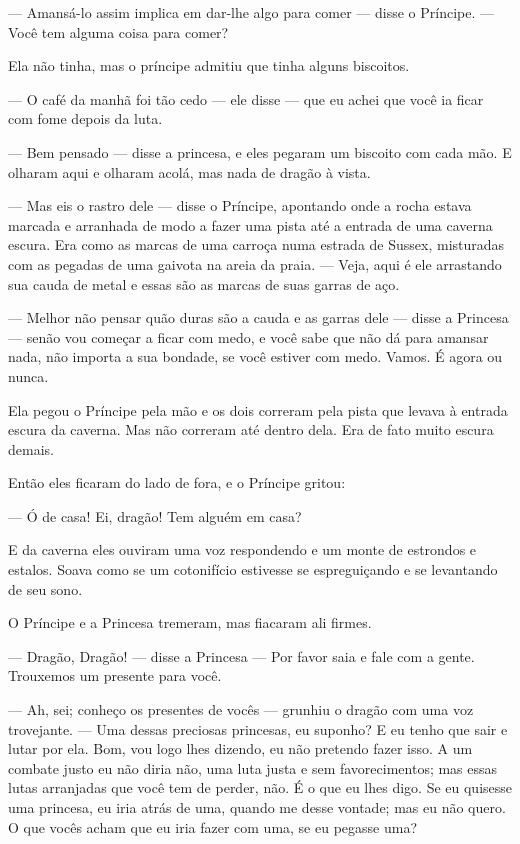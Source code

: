 — Amansá-lo assim implica em dar-lhe algo para comer — disse o
Príncipe. — Você tem alguma coisa para comer?

Ela não tinha, mas o príncipe admitiu que tinha alguns biscoitos. 

— O café da manhã foi tão cedo — ele disse — que eu achei que você ia
ficar com fome depois da luta.

— Bem pensado — disse a princesa, e eles pegaram um biscoito com cada
mão. E olharam aqui e olharam acolá, mas nada de dragão à vista.

— Mas eis o rastro dele — disse o Príncipe, apontando onde a rocha
estava marcada e arranhada de modo a fazer uma pista até a entrada de
uma caverna escura. Era como as marcas de uma carroça numa estrada de
Sussex, misturadas com as pegadas de uma gaivota na areia da praia. —
Veja, aqui é ele arrastando sua cauda de metal e essas são as marcas
de suas garras de aço.

— Melhor não pensar quão duras são a cauda e as garras dele — disse a
Princesa — senão vou começar a ficar com medo, e você sabe que não dá
para amansar nada, não importa a sua bondade, se você estiver com
medo. Vamos. É agora ou nunca.

Ela pegou o Príncipe pela mão e os dois correram pela pista que levava
à entrada escura da caverna. Mas não correram até dentro dela. Era de
fato muito escura demais.

Então eles ficaram do lado de fora, e o Príncipe gritou: 

— Ó de casa! Ei, dragão! Tem alguém em casa?

E da caverna eles ouviram uma voz respondendo e um monte de estrondos
e estalos. Soava como se um cotonifício estivesse se espreguiçando e
se levantando de seu sono.

O Príncipe e a Princesa tremeram, mas fiacaram ali firmes.

— Dragão, Dragão! — disse a Princesa — Por favor saia e fale com a
gente. Trouxemos um presente para você.

— Ah, sei; conheço os presentes de vocês — grunhiu o dragão com uma
voz trovejante. — Uma dessas preciosas princesas, eu suponho? E eu
tenho que sair e lutar por ela. Bom, vou logo lhes dizendo, eu não
pretendo fazer isso. A um combate justo eu não diria não, uma luta
justa e sem favorecimentos; mas essas lutas arranjadas que você tem
de perder, não. É o que eu lhes digo. Se eu quisesse uma princesa, eu
iria atrás de uma, quando me desse vontade; mas eu não quero. O que
vocês acham que eu iria fazer com uma, se eu pegasse uma?

